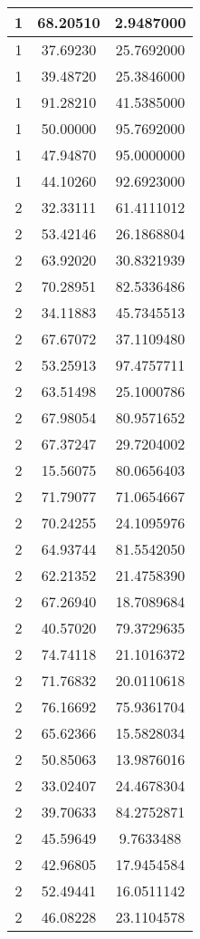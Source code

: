 \documentclass[
]{book}
\begin{document}
\begin{tabular}{c|c|c}
\hline
1 & 68.20510 & 2.9487000\\
\hline
1 & 37.69230 & 25.7692000\\
\hline
1 & 39.48720 & 25.3846000\\
\hline
1 & 91.28210 & 41.5385000\\
\hline
1 & 50.00000 & 95.7692000\\
\hline
1 & 47.94870 & 95.0000000\\
\hline
1 & 44.10260 & 92.6923000\\
\hline
2 & 32.33111 & 61.4111012\\
\hline
2 & 53.42146 & 26.1868804\\
\hline
2 & 63.92020 & 30.8321939\\
\hline
2 & 70.28951 & 82.5336486\\
\hline
2 & 34.11883 & 45.7345513\\
\hline
2 & 67.67072 & 37.1109480\\
\hline
2 & 53.25913 & 97.4757711\\
\hline
2 & 63.51498 & 25.1000786\\
\hline
2 & 67.98054 & 80.9571652\\
\hline
2 & 67.37247 & 29.7204002\\
\hline
2 & 15.56075 & 80.0656403\\
\hline
2 & 71.79077 & 71.0654667\\
\hline
2 & 70.24255 & 24.1095976\\
\hline
2 & 64.93744 & 81.5542050\\
\hline
2 & 62.21352 & 21.4758390\\
\hline
2 & 67.26940 & 18.7089684\\
\hline
2 & 40.57020 & 79.3729635\\
\hline
2 & 74.74118 & 21.1016372\\
\hline
2 & 71.76832 & 20.0110618\\
\hline
2 & 76.16692 & 75.9361704\\
\hline
2 & 65.62366 & 15.5828034\\
\hline
2 & 50.85063 & 13.9876016\\
\hline
2 & 33.02407 & 24.4678304\\
\hline
2 & 39.70633 & 84.2752871\\
\hline
2 & 45.59649 & 9.7633488\\
\hline
2 & 42.96805 & 17.9454584\\
\hline
2 & 52.49441 & 16.0511142\\
\hline
2 & 46.08228 & 23.1104578\\

\end{tabular}
\end{document}
